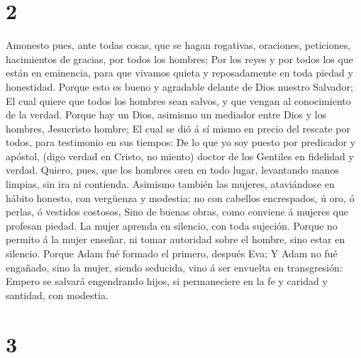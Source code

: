 \hypertarget{section-1}{%
\section{2}\label{section-1}}

 Amonesto pues, ante todas cosas, que se hagan rogativas,
oraciones, peticiones, hacimientos de gracias, por todos los hombres;
 Por los reyes y por todos los que están en eminencia,
para que vivamos quieta y reposadamente en toda piedad y honestidad.
 Porque esto es bueno y agradable delante de Dios nuestro
Salvador;  El cual quiere que todos los hombres sean
salvos, y que vengan al conocimiento de la verdad.  Porque
hay un Dios, asimismo un mediador entre Dios y los hombres, Jesucristo
hombre;  El cual se dió á sí mismo en precio del rescate
por todos, para testimonio en sus tiempos:  De lo que yo
soy puesto por predicador y apóstol, (digo verdad en Cristo, no miento)
doctor de los Gentiles en fidelidad y verdad.  Quiero,
pues, que los hombres oren en todo lugar, levantando manos limpias, sin
ira ni contienda.  Asimismo también las mujeres,
ataviándose en hábito honesto, con vergüenza y modestia; no con cabellos
encrespados, ú oro, ó perlas, ó vestidos costosos,  Sino
de buenas obras, como conviene á mujeres que profesan piedad.
 La mujer aprenda en silencio, con toda sujeción.
 Porque no permito á la mujer enseñar, ni tomar autoridad
sobre el hombre, sino estar en silencio.  Porque Adam fué
formado el primero, después Eva;  Y Adam no fué engañado,
sino la mujer, siendo seducida, vino á ser envuelta en transgresión:
 Empero se salvará engendrando hijos, si permaneciere en
la fe y caridad y santidad, con modestia.

\hypertarget{section-2}{%
\section{3}\label{section-2}}

